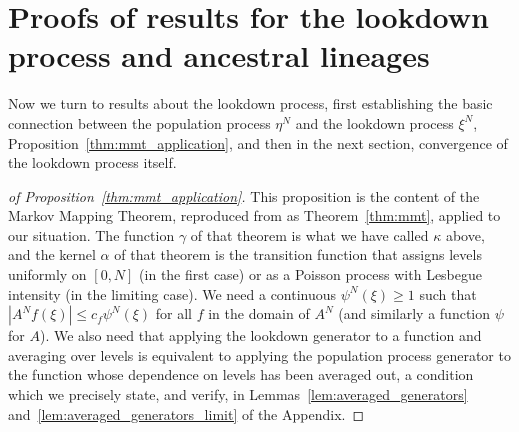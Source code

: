 \documentclass[EJP]{ejpecp} %
\newcommand{\lp}{\xi}              %
\newcommand{\citet}[1]{\cite{#1}}
\begin{document}
\section{Proofs of results for the lookdown process and ancestral lineages}
    \label{sec:lookdown_proofs}

Now we turn to results about the lookdown process,
first establishing the basic connection between the population process $\eta^N$
and the lookdown process $\lp^N$,
Proposition~\ref{thm:mmt_application},
and then in the next section, convergence of the lookdown process itself.

\begin{proof}[of Proposition~\ref{thm:mmt_application}]
    This proposition is the content of the Markov Mapping Theorem,
    reproduced from \citet{etheridge/kurtz:2019} as Theorem~\ref{thm:mmt},
    applied to our situation.
    The function $\gamma$ of that theorem is what we have called $\kappa$ above,
    and the kernel $\alpha$ of that theorem
    is the transition function that assigns levels uniformly on $[0, N]$ (in the first case)
    or as a Poisson process with Lesbegue intensity (in the limiting case).
    We need a continuous $\psi^N(\lp) \ge 1$ such that $|A^N f(\lp)| \le c_f \psi^N(\lp)$
    for all $f$ in the domain of $A^N$ (and similarly a function $\psi$ for $A$).
    We also need that applying the lookdown generator to a function and averaging over levels
    is equivalent to applying the population process generator to the function
    whose dependence on levels has been averaged out,
    a condition which we precisely state, and verify,
    in Lemmas~\ref{lem:averaged_generators} and~\ref{lem:averaged_generators_limit}
    of the Appendix.


\end{proof}
\end{document}

